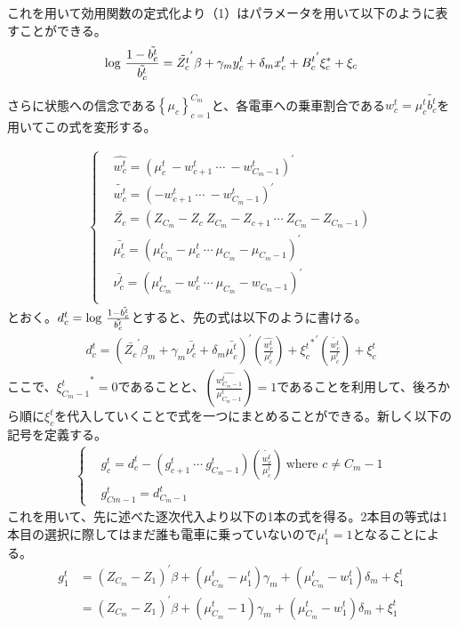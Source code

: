 \documentclass{jsarticle}
\begin{document}
これを用いて効用関数の定式化より（1）はパラメータを用いて以下のように表すことができる。
\begin{align}
	{\rm log}\ \frac{1 - \tilde{{b_c^t}}}{\tilde{b_c^t}} = \tilde{Z_c^t}^{'} \beta + \gamma_m y_c^t + \delta_m x_c^t + {B_c^t}^{'} \xi_c^{*} + \xi_c
\end{align}

さらに状態への信念である$\left\{ \mu_c \right\}_{c = 1}^{C_m}$と、各電車への乗車割合である$w_c^t = \mu_c^t \tilde{b_c^t}$を用いてこの式を変形する。

\begin{align*}
	\begin{cases}
	&\hat{w_c^t} = \left( \mu_c^t\  -w_{c+1}^t\  \cdots\  -w_{C_m-1}^t\right)^{'}\\[8pt]
	&\tilde{w_c^t} =  \left( -w_{c+1}^t\  \cdots\  -w_{C_m-1}^t\right)^{'}\\[8pt]
	&\bar{Z_c} = \left(Z_{C_m} - Z_c\ Z_{C_m} - Z_{c+1}\ \cdots\ Z_{C_m} - Z_{C_m - 1}\right)\\[8pt]
	&\bar{\mu_c^t} = \left( \mu_{C_m}^t - \mu_c^t\ \cdots\ \mu_{C_m} - \mu_{C_m-1} \right)^{'}\\[8pt]
	&\bar{\nu_c^t} = \left( \mu_{C_m}^t - w_c^t\ \cdots\ \mu_{C_m} - w_{C_m-1} \right)^{'}\\[8pt]
	\end{cases}
\end{align*}
とおく。$d_c^t = {\rm log}\ \frac{1 - \tilde{{b_c^t}}}{\tilde{b_c^t}}$とすると、先の式は以下のように書ける。
\begin{align}
	d_c^t = \left( \bar{Z_c}^{'}\beta_m + \gamma_m \bar{\nu_c^t} + \delta_m \bar{\mu_c^t} \right)^{'} \left( \frac{\hat{w_c^t}}{\mu_c^t} \right) + {{\xi_c^t}^{*}}^{'} \left( \frac{\tilde{w_c^t}}{\mu_c^t} \right) + \xi_c^t
\end{align}
ここで、${\xi_{C_m-1}^t}^{*} = 0$であることと、$\left( \frac{\hat{w_{C_m-1}^t}}{\mu_{C_m-1}^t} \right) = 1$であることを利用して、後ろから順に$\xi_c^t$を代入していくことで式を一つにまとめることができる。新しく以下の記号を定義する。
\begin{align*}
\begin{cases}
	&g_c^t = d_c^t - \left( g_{c+1}^t\ \cdots\ g_{C_m-1}^t\right) \left( \frac{\tilde{w_c^t}}{\mu_c^t} \right)\ \text{where $c \neq C_m -1$}\\[8pt]
	&g_{Cm-1}^t = d_{C_m-1}^t
\end{cases}
\end{align*}
これを用いて、先に述べた逐次代入より以下の1本の式を得る。2本目の等式は1本目の選択に際してはまだ誰も電車に乗っていないので$\mu_1^t = 1$となることによる。
\begin{align*}
	g_1^t &= (Z_{C_m} - Z_1)^{'} \beta + (\mu_{C_m}^t - \mu_1^t)\gamma_m + (\mu_{C_m}^t - w_1^t)\delta_m + \xi_1^t\\[8pt]
	&= (Z_{C_m} - Z_1)^{'} \beta + \left(\mu_{C_m}^t-1\right)\gamma_m + (\mu_{C_m}^t - w_1^t)\delta_m + \xi_1^t
\end{align*}
\end{document}

